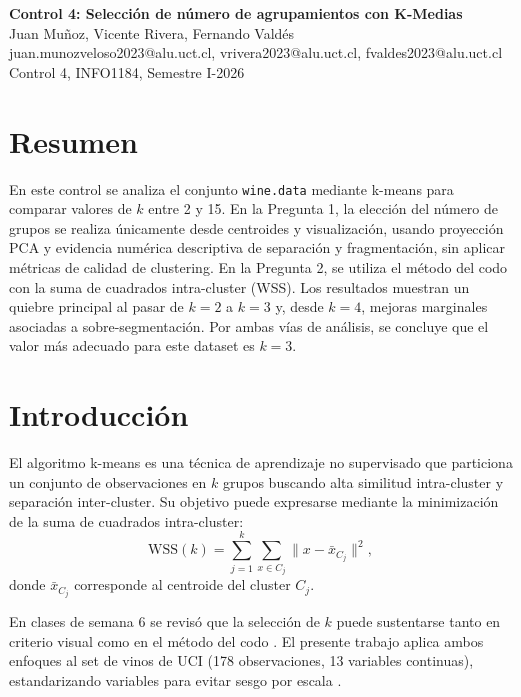 \documentclass[10pt,a4paper]{article}
\begin{document}
\begin{center}
{\LARGE \textbf{Control 4: Selección de número de agrupamientos con K-Medias}}\\[4pt]
{\normalsize Juan Muñoz, Vicente Rivera, Fernando Valdés}\\[2pt]
{\small juan.munozveloso2023@alu.uct.cl, vrivera2023@alu.uct.cl, fvaldes2023@alu.uct.cl}\\[2pt]
{\small Control 4, INFO1184, Semestre I-2026}
\end{center}

\section*{Resumen}

En este control se analiza el conjunto \texttt{wine.data} mediante k-means para comparar valores de $k$ entre 2 y 15. En la Pregunta 1, la elección del número de grupos se realiza únicamente desde centroides y visualización, usando proyección PCA y evidencia numérica descriptiva de separación y fragmentación, sin aplicar métricas de calidad de clustering. En la Pregunta 2, se utiliza el método del codo con la suma de cuadrados intra-cluster (WSS). Los resultados muestran un quiebre principal al pasar de $k=2$ a $k=3$ y, desde $k=4$, mejoras marginales asociadas a sobre-segmentación. Por ambas vías de análisis, se concluye que el valor más adecuado para este dataset es $k=3$.

\section{Introducción}

El algoritmo k-means es una técnica de aprendizaje no supervisado que particiona un conjunto de observaciones en $k$ grupos buscando alta similitud intra-cluster y separación inter-cluster. Su objetivo puede expresarse mediante la minimización de la suma de cuadrados intra-cluster:
\begin{equation}
\text{WSS}(k) = \sum_{j=1}^{k} \sum_{x \in C_j} \|x - \bar{x}_{C_j}\|^2,
\label{eq:wss}
\end{equation}
donde $\bar{x}_{C_j}$ corresponde al centroide del cluster $C_j$.

En clases de semana 6 se revisó que la selección de $k$ puede sustentarse tanto en criterio visual como en el método del codo \citep{levano2026}. El presente trabajo aplica ambos enfoques al set de vinos de UCI (178 observaciones, 13 variables continuas), estandarizando variables para evitar sesgo por escala \citep{aeberhard1991}.
\end{document}
